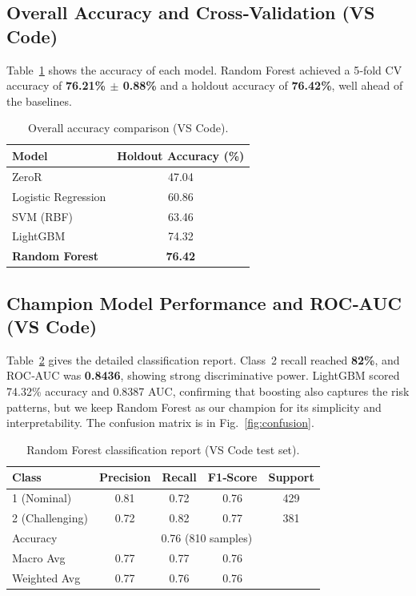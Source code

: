 \documentclass[conference]{IEEEtran}
\begin{document}
\subsection{Overall Accuracy and Cross‑Validation (VS Code)}
Table~\ref{tab:acc_vscode} shows the accuracy of each model. Random Forest achieved a 5‑fold CV accuracy of \textbf{76.21\% $\pm$ 0.88\%} and a holdout accuracy of \textbf{76.42\%}, well ahead of the baselines.

\begin{table}[t]
\centering
\caption{Overall accuracy comparison (VS Code).}
\label{tab:acc_vscode}
\begin{tabular}{lc}
\toprule
\textbf{Model} & \textbf{Holdout Accuracy (\%)} \\
\midrule
ZeroR & 47.04 \\
Logistic Regression & 60.86 \\
SVM (RBF) & 63.46 \\
LightGBM & 74.32 \\
\textbf{Random Forest} & \textbf{76.42} \\
\bottomrule
\end{tabular}
\end{table}

\subsection{Champion Model Performance and ROC‑AUC (VS Code)}
Table~\ref{tab:report_vscode} gives the detailed classification report. Class~2 recall reached \textbf{82\%}, and ROC‑AUC was \textbf{0.8436}, showing strong discriminative power. LightGBM scored 74.32\% accuracy and 0.8387 AUC, confirming that boosting also captures the risk patterns, but we keep Random Forest as our champion for its simplicity and interpretability. The confusion matrix is in Fig.~\ref{fig:confusion}.

\begin{table}[t]
\centering
\caption{Random Forest classification report (VS Code test set).}
\label{tab:report_vscode}
\begin{tabular}{lcccc}
\toprule
\textbf{Class} & \textbf{Precision} & \textbf{Recall} & \textbf{F1‑Score} & \textbf{Support} \\
\midrule
1 (Nominal) & 0.81 & 0.72 & 0.76 & 429 \\
2 (Challenging) & 0.72 & 0.82 & 0.77 & 381 \\
\midrule
Accuracy & \multicolumn{4}{c}{0.76 (810 samples)} \\
Macro Avg & 0.77 & 0.77 & 0.76 & \\
Weighted Avg & 0.77 & 0.76 & 0.76 & \\
\bottomrule
\end{tabular}
\end{table}
\end{document}
